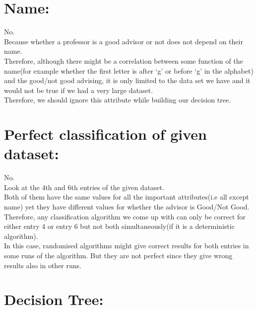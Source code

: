 \documentclass[a4paper,11pt]{article}
\begin{document}

\begin{mlsolution}

\section{Name:}
No. 
\\Because whether a professor is a good advisor or not does not depend on their name. 
\\Therefore, although there might be a correlation between some function of the name(for example whether the first letter is after `g' or before `g' in the alphabet) and the good/not good advising, it is only limited to the data set we have and it would not be true if we had a very large dataset. 
\\Therefore, we should ignore this attribute while building our decision tree.

\section{Perfect classification of given dataset:}
No.
\\Look at the 4th and 6th entries of the given dataset. 
\\Both of them have the same values for all the important attributes(i.e all except name) yet they have different values for whether the advisor is Good/Not Good. 
\\Therefore, any classification algorithm we come up with can only be correct for either entry 4 or entry 6 but not both simultaneously(if it is a deterministic algorithm).
\\In this case, randomised algorithms might give correct results for both entries in some runs of the algorithm. But they are not perfect since they give wrong results also in other runs.

\section{Decision Tree:}
\begin{center}
\end{center}



\end{mlsolution}
\end{document}
